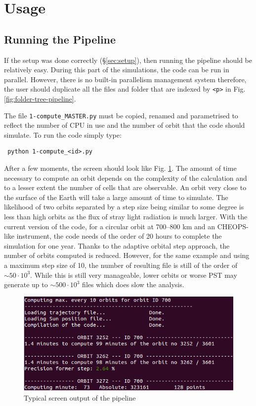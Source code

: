 \documentclass[a4paper,10pt]{article}
\begin{document}
\section{Usage} \label{sec:Usage}
\subsection{Running the Pipeline}
If the setup was done correctly (\S\ref{sec:setup}), then running the pipeline should be relatively easy. During this part of the simulations, the code can be run in parallel. 
However, there is no built-in parallelism management system therefore, the user should duplicate all the files and folder that are indexed by \verb=<p>= in Fig. \ref{fig:folder-tree-pipeline}.

The file \verb=1-compute_MASTER.py= must be copied, renamed and parametrised to reflect the number of CPU in use and the number of orbit that the code should simulate.
To run the code simply type:
\begin{lstlisting}
 python 1-compute_<id>.py
\end{lstlisting}
After a few moments, the screen should look like Fig. \ref{fig:ex-pipeline}. The amount of time necessary to compute an orbit depends on the complexity of the calculation and to a lesser extent the number of cells that are observable. An orbit very close to the surface of the Earth will take a large amount of time to simulate.
The likelihood of two orbits separated by a step size being similar to some degree is less than high orbits as the flux of stray light radiation is much larger. With the current version of the code, for a circular orbit at 700--800 km and an CHEOPS-like instrument, the code needs of the order of 20 hours to complete the simulation for one year.
Thanks to the adaptive orbital step approach, the number of orbits computed is reduced. However, for the same example and using a maximum step size of 10, the number of resulting file is still of the order of $\sim50\cdot 10^3$. While this is still very manageable, lower orbits or worse PST may generate up to $\sim500\cdot 10^3$ files which does slow the analysis.
\begin{figure}[h]
 \begin{center}
  \includegraphics[width=0.7\linewidth]{ex-pipeline}
 \end{center}
\caption{Typical screen output of the pipeline\label{fig:ex-pipeline}}
\end{figure}
\end{document}
